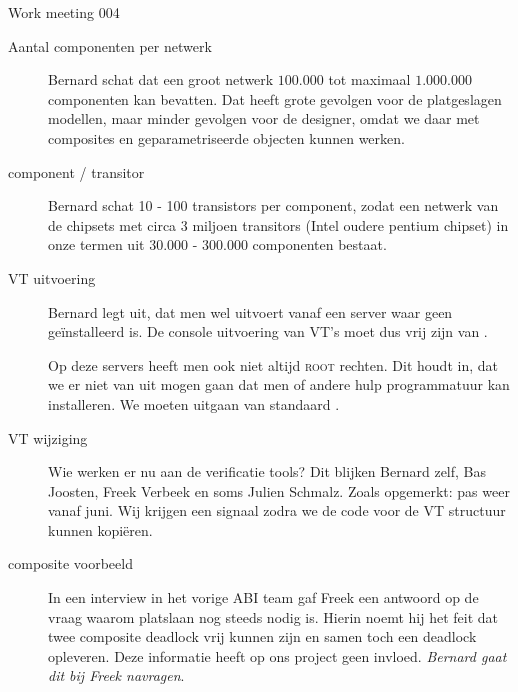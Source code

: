 \documentclass[a4paper,final]{article}
\begin{document}
\begin{Minutes}{Work meeting 004}
\begin{description}
	\item[Aantal componenten per netwerk] Bernard schat dat een groot netwerk $100.000$ 
	tot maximaal $1.000.000$ componenten kan bevatten. Dat heeft grote gevolgen voor de
	platgeslagen modellen, maar minder gevolgen voor de designer, omdat we daar met
	composites en geparametriseerde objecten kunnen werken.
		
	\item[component / transitor] Bernard schat 10 - 100 transistors per component, zodat
	een netwerk van de chipsets met circa 3 miljoen transitors (Intel oudere pentium chipset) 
	in onze termen uit $30.000$ - $300.000$ componenten bestaat. 
	
	\item[VT uitvoering] Bernard legt uit, dat men wel uitvoert vanaf een server
	waar geen \qt ge\"installeerd is. De console uitvoering van VT's moet dus vrij
	zijn van \qt.

	Op deze servers heeft men ook niet altijd \textsc{root} rechten. Dit houdt in, dat we 
	er niet van uit mogen gaan dat men \qt of andere hulp programmatuur kan installeren.
	We moeten uitgaan van standaard \cpp.
	
	\item[VT wijziging] Wie werken er nu aan de verificatie tools? Dit blijken Bernard zelf, 
	Bas Joosten, Freek Verbeek en soms Julien Schmalz. Zoals opgemerkt: pas weer vanaf juni.
	Wij krijgen een signaal zodra we de code voor de VT structuur kunnen kopi\"{e}ren.
	
	\item[composite voorbeeld] In een interview in het vorige ABI team gaf Freek een antwoord
	op de vraag waarom platslaan nog steeds nodig is. Hierin noemt hij het feit dat twee
	composite deadlock vrij kunnen zijn en samen toch een deadlock opleveren. Deze informatie
	heeft op ons project geen invloed. \textit{Bernard gaat dit bij Freek navragen}. 
	
\end{description}


\end{Minutes}
\end{document}
